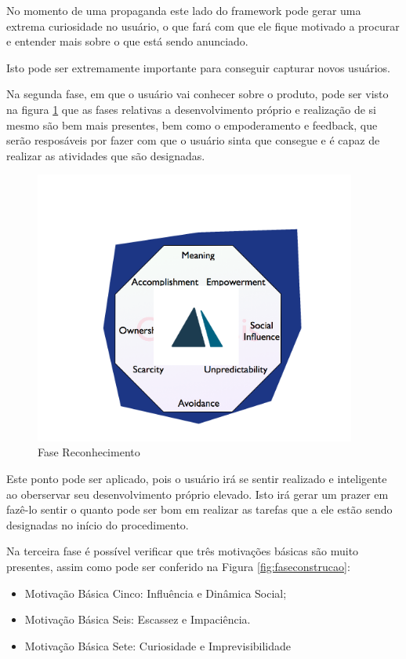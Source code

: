 No momento de uma propaganda este lado do framework pode gerar uma
extrema curiosidade no usuário, o que fará com que ele fique motivado a procurar
e entender mais sobre o que está sendo anunciado.

Isto pode ser extremamente importante para conseguir capturar novos usuários.

Na segunda fase, em que o usuário vai conhecer sobre o produto, pode ser visto
na figura \ref{fig:fasereconhecimento} que as fases relativas a desenvolvimento próprio e realização de si mesmo
são bem mais presentes, bem como o empoderamento e feedback, que serão
resposáveis por fazer com que o usuário sinta que consegue e é capaz
de realizar as atividades que são designadas.

\begin{figure}[h]
    \centering
    \includegraphics[width=400px, scale=1]{figuras/fasereconhecimento}
    \caption{Fase Reconhecimento}
    \label{fig:fasereconhecimento}
\end{figure}

Este ponto pode ser aplicado, pois o usuário irá se sentir realizado e inteligente
ao oberservar seu desenvolvimento próprio elevado. Isto irá gerar um prazer em fazê-lo
sentir o quanto pode ser bom em realizar as tarefas que a ele estão sendo designadas
no início do procedimento.

Na terceira fase é possível verificar que três motivações básicas são muito presentes,
assim como pode ser conferido na Figura \ref{fig:faseconstrucao}:



\begin{itemize}
    \item Motivação Básica Cinco: Influência e Dinâmica Social;
    \item Motivação Básica Seis: Escassez e Impaciência.
    \item Motivação Básica Sete: Curiosidade e Imprevisibilidade
\end{itemize}

